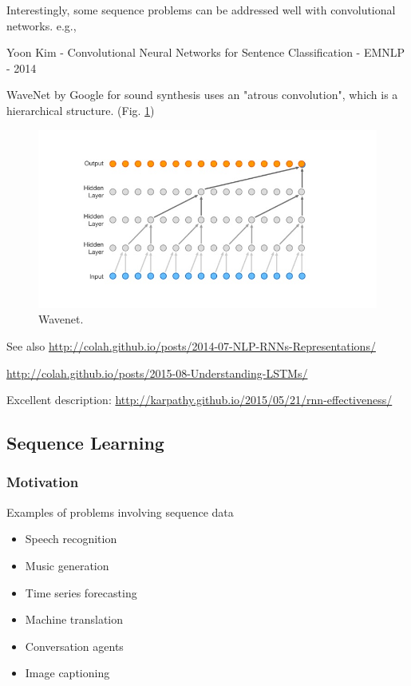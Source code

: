 \documentclass[english]{article}
\begin{document}
\item Interestingly, some sequence problems can be addressed well with convolutional networks. e.g., 

Yoon Kim - Convolutional Neural Networks for Sentence Classification - EMNLP - 2014

WaveNet by Google for sound synthesis uses an "atrous convolution", which is a hierarchical structure. (Fig. \ref{wavenet})

\begin{figure}
  \centering
  \includegraphics[scale=0.8]{wavenet.jpg}
    \caption{Wavenet.}
    \label{wavenet}
\end{figure}



\item See also \url{http://colah.github.io/posts/2014-07-NLP-RNNs-Representations/}

\url{http://colah.github.io/posts/2015-08-Understanding-LSTMs/}

Excellent description: \url{http://karpathy.github.io/2015/05/21/rnn-effectiveness/}

\eenum 

\subsection{Sequence Learning}

\subsubsection{Motivation} %
\benum
\item 
 {Examples of problems involving sequence data}
\begin{itemize}
\item Speech recognition
\item Music generation
\item Time series forecasting
\item Machine translation
\item Conversation agents
\item Image captioning
\end{itemize}
 
\end{document}
